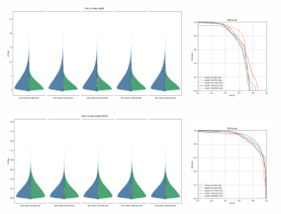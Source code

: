 \begin{figure}[!ht]
    \centering
    \includegraphics[width=0.6\textwidth]{../images/realworldexperiments/scarlatti/violinplots/TrainVsFake_avgIOI.png}
    \includegraphics[width=0.3\textwidth]{../images/realworldexperiments/scarlatti/prcurves/PRCurveScarlatti_avgIOI.png}
\end{figure}
\begin{figure}[!ht]
    \centering
    \includegraphics[width=0.6\textwidth]{../images/realworldexperiments/scarlatti/violinplots/TrainVsFake_avgPitchShift.png}
    \includegraphics[width=0.3\textwidth]{../images/realworldexperiments/scarlatti/prcurves/PRCurveScarlatti_avgPitchShift.png}
\end{figure}  
